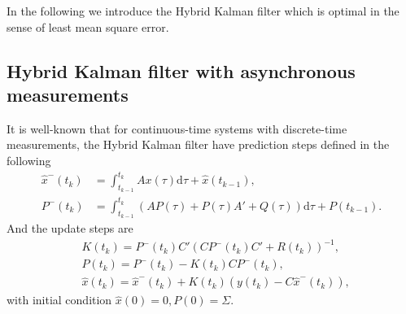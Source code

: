 \documentclass[12pt]{article}
\newcommand{\rd}{{\mathrm{d}}}
\begin{document}
In the following we introduce the Hybrid Kalman filter which is optimal in the sense of least mean square error. 







\subsection{Hybrid Kalman filter with asynchronous measurements}\label{sec:hybrid_kalman}
It is well-known that for continuous-time systems with discrete-time measurements, the Hybrid Kalman filter have prediction steps defined in the following
\begin{align}
\hat{x}^-(t_{k})&=\int_{t_{k-1}}^{t_{k}} A x(\tau) \rd \tau + \hat{x}(t_{k-1}),\label{eq:def_x-}\\
P^-(t_{k})&=\int_{t_{k-1}}^{t_{k}} \left( A P(\tau)+ P(\tau)A{'} +Q(\tau) \right)\rd \tau + P(t_{k-1}) \label{eq:def_P-} .
\end{align}
And the update steps are
\begin{align}
& K(t_k)=P^-(t_{k}) C{'} \left(C P^-(t_{k}) C{'}+R(t_k) \right)^{-1}, \label{eq:def_Kk} \\	
& P(t_{k}) = P^-(t_k)-K(t_k) C P^-(t_k), \label{eq:def_Pt} \\
& \hat{x}(t_{k})=\hat{x}^-(t_k) + K(t_k)  \left(y(t_{k})-C\hat{x}^-(t_{k}) \right) , \label{eq:def_xt}
\end{align}
with initial condition $\hat{x}(0)=0, P(0)=\Sigma .$
\end{document}
